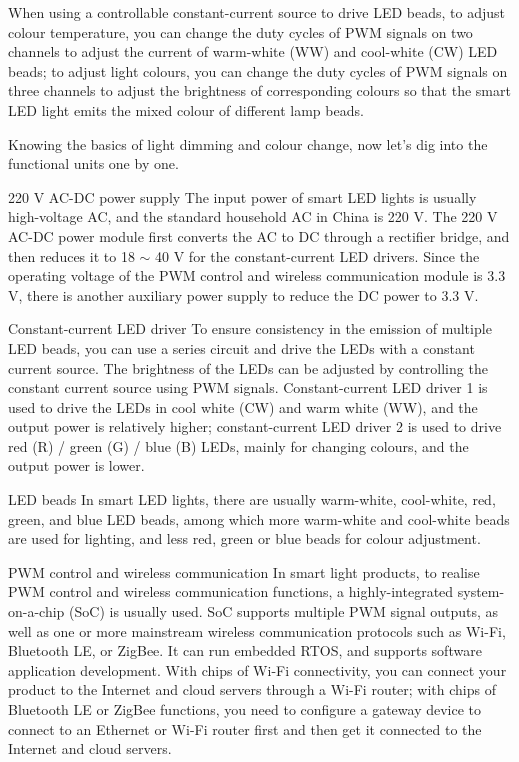 \documentclass[a4paper,12pt]{book}
\begin{document}
When using a controllable constant-current source to drive LED beads, to adjust colour temperature, you can change the duty cycles of PWM signals on two channels to adjust the current of warm-white (WW) and cool-white (CW) LED beads; to adjust light colours, you can change the duty cycles of PWM signals on three channels to adjust the brightness of corresponding colours so that the smart LED light emits the mixed colour of different lamp beads.

Knowing the basics of light dimming and colour change, now let’s dig into the functional units one by one.

\begin{term}{220 V AC-DC power supply}
    The input power of smart LED lights is usually high-voltage AC, and the standard household AC in China is 220 V. The 220 V AC-DC power module first converts the AC to DC through a rectifier bridge, and then reduces it to 18 $\sim$ 40 V for the constant-current LED drivers. Since the operating voltage of the PWM control and wireless communication module is 3.3 V, there is another auxiliary power supply to reduce the DC power to 3.3 V.
\end{term}

\begin{term}{Constant-current LED driver}
    To ensure consistency in the emission of multiple LED beads, you can use a series circuit and drive the LEDs with a constant current source. The brightness of the LEDs can be adjusted by controlling the constant current source using PWM signals. Constant-current LED driver 1 is used to drive the LEDs in cool white (CW) and warm white (WW), and the output power is relatively higher; constant-current LED driver 2 is used to drive red (R) / green (G) / blue (B) LEDs, mainly for changing colours, and the output power is lower.
\end{term}

\begin{term}{LED beads}
    In smart LED lights, there are usually warm-white, cool-white, red, green, and blue LED beads, among which more warm-white and cool-white beads are used for lighting, and less red, green or blue beads for colour adjustment.
\end{term}

\begin{term}{PWM control and wireless communication}
    In smart light products, to realise PWM control and wireless communication functions, a highly-integrated system-on-a-chip (SoC) is usually used. SoC supports multiple PWM signal outputs, as well as one or more mainstream wireless communication protocols such as Wi-Fi, Bluetooth LE, or ZigBee. It can run embedded RTOS, and supports software application development. With chips of Wi-Fi connectivity, you can connect your product to the Internet and cloud servers through a Wi-Fi router; with chips of Bluetooth LE or ZigBee functions, you need to configure a gateway device to connect to an Ethernet or Wi-Fi router first and then get it connected to the Internet and cloud servers.
\end{term}
\end{document}
